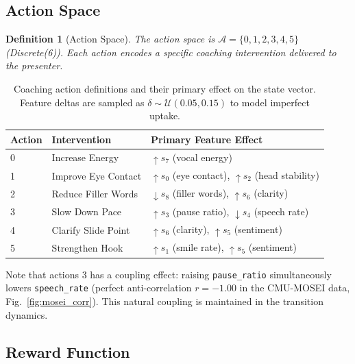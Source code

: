\documentclass{article}
\newtheorem{definition}{Definition}
\begin{document}
\FloatBarrier
\subsection{Action Space}
\label{sec:actions}

\begin{definition}[Action Space]
The action space is $\mathcal{A} = \{0,1,2,3,4,5\}$ (Discrete(6)).
Each action encodes a specific coaching intervention delivered to the
presenter.
\end{definition}

\begin{table}[htbp]
\centering
\caption{Coaching action definitions and their primary effect on the
state vector. Feature deltas are sampled as
$\delta \sim \mathcal{U}(0.05, 0.15)$ to model imperfect uptake.}
\label{tab:actions}
\small
\begin{tabular}{lll}
\toprule
\textbf{Action} & \textbf{Intervention} & \textbf{Primary Feature Effect} \\
\midrule
0 & Increase Energy     & $\uparrow s_7$ (vocal energy) \\
1 & Improve Eye Contact & $\uparrow s_0$ (eye contact), $\uparrow s_2$ (head stability) \\
2 & Reduce Filler Words & $\downarrow s_8$ (filler words), $\uparrow s_6$ (clarity) \\
3 & Slow Down Pace      & $\uparrow s_3$ (pause ratio), $\downarrow s_4$ (speech rate) \\
4 & Clarify Slide Point & $\uparrow s_6$ (clarity), $\uparrow s_5$ (sentiment) \\
5 & Strengthen Hook     & $\uparrow s_1$ (smile rate), $\uparrow s_5$ (sentiment) \\
\bottomrule
\end{tabular}
\end{table}

Note that actions 3 has a coupling effect: raising \texttt{pause\_ratio}
simultaneously lowers \texttt{speech\_rate} (perfect anti-correlation
$r = -1.00$ in the CMU-MOSEI data, Fig.~\ref{fig:mosei_corr}).
This natural coupling is maintained in the transition dynamics.

\FloatBarrier
\subsection{Reward Function}
\label{sec:reward}
\end{document}
